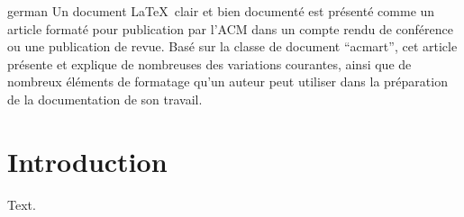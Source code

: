 \documentclass[sigconf, language=english, language=german,language=french]{acmart}
\begin{document}
\begin{translatedabstract}{german}
  Un document \LaTeX\ clair et bien documenté est présenté comme un
  article formaté pour publication par l'ACM dans un compte rendu de
  conférence ou une publication de revue. Basé sur la classe de
  document ``acmart'', cet article présente et explique de nombreuses
  des variations courantes, ainsi que de nombreux éléments de
  formatage qu'un auteur peut utiliser dans la préparation de la
  documentation de son travail.
\end{translatedabstract}

\maketitle
\section{Introduction}
Text.

\end{document}
